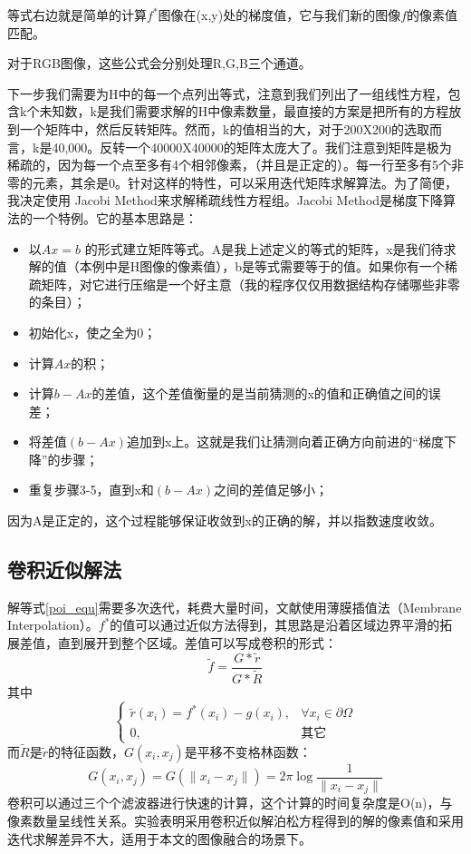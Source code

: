 等式右边就是简单的计算\(f^*\)图像在(x,y)处的梯度值，它与我们新的图像\(f\)的像素值匹配。

对于RGB图像，这些公式会分别处理R,G,B三个通道。

下一步我们需要为H中的每一个点列出等式，注意到我们列出了一组线性方程，包含k个未知数，k是我们需要求解的H中像素数量，最直接的方案是把所有的方程放到一个矩阵中，然后反转矩阵。然而，k的值相当的大，对于200X200的选取而言，k是40,000。反转一个40000X40000的矩阵太庞大了。我们注意到矩阵是极为稀疏的，因为每一个点至多有4个相邻像素，（并且是正定的）。每一行至多有5个非零的元素，其余是0。针对这样的特性，可以采用迭代矩阵求解算法。为了简便，我决定使用 Jacobi Method来求解稀疏线性方程组。Jacobi Method是梯度下降算法的一个特例。它的基本思路是：

\begin{itemize}
\item 以\(A x = b\) 的形式建立矩阵等式。A是我上述定义的等式的矩阵，x是我们待求解的值（本例中是H图像的像素值），b是等式需要等于的值。如果你有一个稀疏矩阵，对它进行压缩是一个好主意（我的程序仅仅用数据结构存储哪些非零的条目）；
\item 初始化x，使之全为0；
\item 计算\(Ax\)的积；
\item 计算\(b-Ax\)的差值，这个差值衡量的是当前猜测的x的值和正确值之间的误差；
\item 将差值\((b-Ax)\)追加到x上。这就是我们让猜测向着正确方向前进的“梯度下降”的步骤；
\item 重复步骤3-5，直到x和\((b-Ax)\)之间的差值足够小；
\end{itemize}

因为A是正定的，这个过程能够保证收敛到x的正确的解，并以指数速度收敛。

\subsection{卷积近似解法}
解等式\eqref{poi_equ}需要多次迭代，耗费大量时间，文献\cite{Farbman:2011dc}使用薄膜插值法（Membrane Interpolation）。\(f^*\)的值可以通过近似方法得到，其思路是沿着区域边界平滑的拓展差值，直到展开到整个区域。差值可以写成卷积的形式：
\begin{equation}
\tilde{f} = \frac{G * \tilde{r}}{G * \tilde{R}}
\label{con_pyr}
\end{equation}
其中
\begin{equation}
\begin{cases} 
\tilde{r}(x_i) = f^*(x_i) - g(x_i), & \forall{x_i} \in \partial\Omega \\
0, & \mbox{其它}
\end{cases}
\label{con_pyr}
\end{equation}
而\(\tilde{R}\)是\(\tilde{r}\)的特征函数，\(G(x_i,x_j)\)是平移不变格林函数：
\begin{equation}
G(x_i,x_j) = G(\|x_i - x_j\|) = 2\pi\log{\frac{1}{\|x_i - x_j\|}}
\end{equation}
卷积可以通过三个个滤波器进行快速的计算，这个计算的时间复杂度是O(n)，与像素数量呈线性关系。实验表明采用卷积近似解泊松方程得到的解的像素值和采用迭代求解差异不大，适用于本文的图像融合的场景下。


\ifx\usechapbib\empty
\nocite{BSTcontrol}


\fi